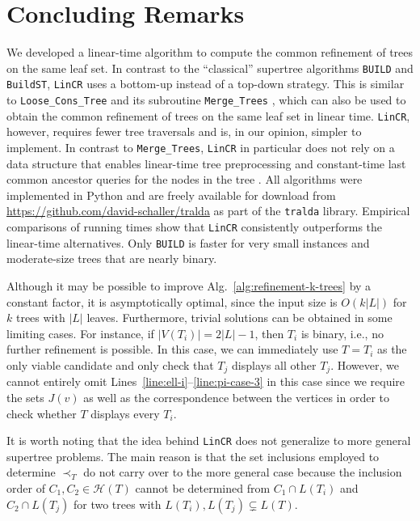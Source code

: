 \documentclass[11pt]{article}
\newcommand{\HH}{\mathcal{H}}
\begin{document}
\section*{Concluding Remarks} 

We developed a linear-time algorithm to compute the common refinement of
trees on the same leaf set.  In contrast to the ``classical'' supertree
algorithms \texttt{BUILD} and \texttt{BuildST}, \texttt{LinCR} uses a
bottom-up instead of a top-down strategy. This is similar to
\texttt{Loose_Cons_Tree} and its subroutine \texttt{Merge_Trees}
\cite{Jansson:16}, which can also be used to obtain the common refinement
of trees on the same leaf set in linear time.  \texttt{LinCR}, however,
requires fewer tree traversals and is, in our opinion, simpler to
implement. In contrast to \texttt{Merge_Trees}, \texttt{LinCR} in
particular does not rely on a data structure that enables linear-time tree
preprocessing and constant-time last common ancestor queries for the nodes
in the tree \cite{Bender:05}.  All algorithms were implemented in Python
and are freely available for download from
\url{https://github.com/david-schaller/tralda} as part of the
\texttt{tralda} library. Empirical comparisons of running times show that
\texttt{LinCR} consistently outperforms the linear-time alternatives.
Only \texttt{BUILD} is faster for very small instances and moderate-size
trees that are nearly binary.


Although it may be possible to improve Alg.~\ref{alg:refinement-k-trees} by
a constant factor, it is asymptotically optimal, since the input size is
$O(k|L|)$ for $k$ trees with $|L|$ leaves. Furthermore, trivial solutions
can be obtained in some limiting cases. For instance, if $|V(T_i)|=2|L|-1$,
then $T_i$ is binary, i.e., no further refinement is possible. In this case,
we can immediately use $T=T_i$ as the only viable candidate and only check
that $T_j$ displays all other $T_j$.  However, we cannot entirely omit
Lines~\ref{line:ell-i}--\ref{line:pi-case-3} in this case since we require
the sets $J(v)$ as well as the correspondence between the vertices in order
to check whether $T$ displays every $T_i$. 

It is worth noting that the idea behind \texttt{LinCR} does not generalize
to more general supertree problems. The main reason is that the set
inclusions employed to determine $\prec_T$ do not carry over to the more
general case because the inclusion order of $C_1,C_2\in\HH(T)$ cannot be
determined from $C_1\cap L(T_i)$ and $C_2\cap L(T_j)$ for two trees with
$L(T_i),L(T_j)\subsetneq L(T)$.
\end{document}
